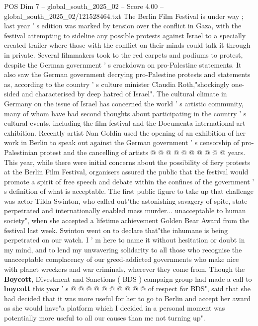 \begin{textsample}{POS Dim 7 – global\_south\_2025\_02 – Score 4.00 – global\_south\_2025\_02/121528464.txt}  \label{ex:f7_pos_417}
The Berlin Film Festival is under way ; last year ' s edition was marked by tension over the conflict in Gaza, with the festival attempting to sideline any possible protests against Israel to a specially created trailer where those with the conflict on their minds could talk it through in private.
Several filmmakers took to the red carpets and podiums to protest, despite the German government ' s crackdown on pro-Palestine statements.
It also saw the German government decrying pro-Palestine protests and statements as, according to the country ' s culture minister Claudia Roth,"shockingly one-sided and characterised by deep hatred of Israel".
The cultural climate in Germany on the issue of Israel has concerned the world ' s artistic community, many of whom have had second thoughts about participating in the country ' s cultural events, including the film festival and the Documenta international art exhibition.
Recently artist Nan Goldin used the opening of an exhibition of her work in Berlin to speak out against the German government ' s censorship of pro-Palestinian protest and the cancelling of artists @ @ @ @ @ @ @ @ @ @ years.
This year, while there were initial concerns about the possibility of fiery protests at the Berlin Film Festival, organisers assured the public that the festival would promote a spirit of free speech and debate within the confines of the government ' s definition of what is acceptable.
The first public figure to take up that challenge was actor Tilda Swinton, who called out"the astonishing savagery of spite, state-perpetrated and internationally enabled mass murder... unacceptable to human society", when she accepted a lifetime achievement Golden Bear Award from the festival last week.
Swinton went on to declare that"the inhumane is being perpetrated on our watch.
I ' m here to name it without hesitation or doubt in my mind, and to lend my unwavering solidarity to all those who recognise the unacceptable complacency of our greed-addicted governments who make nice with planet wreckers and war criminals, wherever they come from.
Though the \textbf{Boycott}, Divestment and Sanctions ( BDS ) campaign group had made a call to \textbf{boycott} this year ' s @ @ @ @ @ @ @ @ @ @ of respect for BDS", said that she had decided that it was more useful for her to go to Berlin and accept her award as she would have"a platform which I decided in a personal moment was potentially more useful to all our causes than me not turning up".

\end{textsample}

